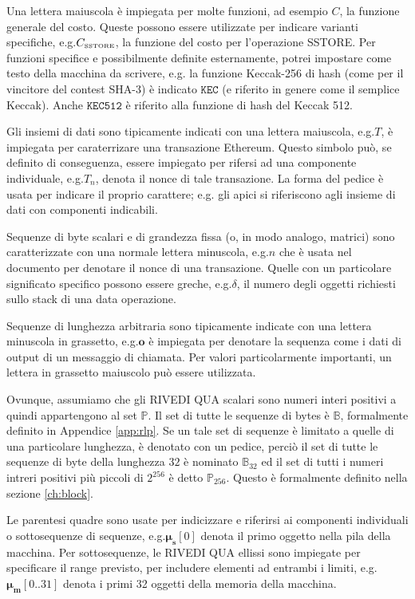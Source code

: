 \documentclass[9pt,oneside]{amsart}
\makeatletter
\newcommand*\eg{e.g.\@\xspace}
\makeatother
\begin{document}
\begin{multicols}{2}
Una lettera maiuscola è impiegata per molte funzioni, ad esempio $C$, la funzione generale del costo. Queste possono essere utilizzate per indicare varianti specifiche, \eg $C_\text{\tiny SSTORE}$, la funzione del costo per l'operazione {\tiny SSTORE}. Per funzioni specifice e possibilmente definite esternamente, potrei impostare come testo della macchina da scrivere, \eg la funzione Keccak-256 di hash (come per il vincitore del contest SHA-3) è indicato $\texttt{KEC}$ (e riferito in genere come il semplice Keccak). Anche $\texttt{KEC512}$ è riferito alla funzione di hash del Keccak 512.

Gli insiemi di dati sono tipicamente indicati con una lettera maiuscola, \eg $T$, è impiegata per caraterrizare una transazione Ethereum. Questo simbolo può, se definito di conseguenza, essere impiegato per rifersi ad una componente individuale, \eg $T_n$, denota il nonce di tale transazione. La forma del pedice è usata per indicare il proprio carattere; \eg gli apici si riferiscono agli insieme di dati con componenti indicabili.

Sequenze di byte scalari e di grandezza fissa (o, in modo analogo, matrici) sono caratterizzate con una normale lettera minuscola, \eg $n$ che è usata nel documento per denotare il nonce di una transazione. Quelle con un particolare significato specifico possono essere greche, \eg $\delta$, il numero degli oggetti richiesti sullo stack di una data operazione.

Sequenze di lunghezza arbitraria sono tipicamente indicate con una lettera minuscola in grassetto, \eg $\mathbf{o}$ è impiegata per denotare la sequenza come i dati di output di un messaggio di chiamata. Per valori particolarmente importanti, un lettera in grassetto maiuscolo può essere utilizzata.

Ovunque, assumiamo che gli RIVEDI QUA scalari sono numeri interi positivi a quindi appartengono al set $\mathbb{P}$. Il set di tutte le sequenze di bytes è $\mathbb{B}$, formalmente definito in Appendice \ref{app:rlp}. Se un tale set di sequenze è limitato a quelle di una particolare lunghezza, è denotato con un pedice, perciò il set di tutte le sequenze di byte della lunghezza $32$ è nominato $\mathbb{B}_{32}$ ed il set di tutti i numeri intreri positivi più piccoli di $2^{256}$ è detto $\mathbb{P}_{256}$. Questo è formalmente definito nella sezione \ref{ch:block}.

Le parentesi quadre sono usate per indicizzare e riferirsi ai componenti individuali o sottosequenze di sequenze, \eg $\boldsymbol{\mu}_\mathbf{s}[0]$ denota il primo oggetto nella pila della macchina. Per sottosequenze, le RIVEDI QUA ellissi sono impiegate per specificare il range previsto, per includere elementi ad entrambi i limiti, \eg $\boldsymbol{\mu}_\mathbf{m}[0..31]$ denota i primi 32 oggetti della memoria della macchina.


\end{multicols}
\end{document}
